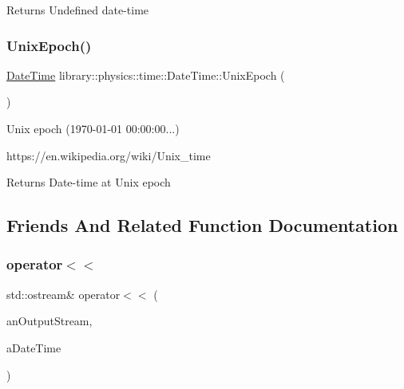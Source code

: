 \begin{DoxyReturn}{Returns}
Undefined date-\/time 
\end{DoxyReturn}
\mbox{\label{classlibrary_1_1physics_1_1time_1_1_date_time_afc52d4f5c9c6e6e13e4c16e0f15018f6}} 
\subsubsection{\texorpdfstring{Unix\+Epoch()}{UnixEpoch()}}
{\footnotesize\ttfamily \hyperlink{classlibrary_1_1physics_1_1time_1_1_date_time}{Date\+Time} library\+::physics\+::time\+::\+Date\+Time\+::\+Unix\+Epoch (\begin{DoxyParamCaption}{ }\end{DoxyParamCaption})\hspace{0.3cm}{\ttfamily [static]}}



Unix epoch (1970-\/01-\/01 00\+:00\+:00...) 

https\+://en.wikipedia.\+org/wiki/\+Unix\+\_\+time

\begin{DoxyReturn}{Returns}
Date-\/time at Unix epoch 
\end{DoxyReturn}


\subsection{Friends And Related Function Documentation}
\mbox{\label{classlibrary_1_1physics_1_1time_1_1_date_time_afd7a10118810d4133db2044ddbb7e001}} 
\subsubsection{\texorpdfstring{operator$<$$<$}{operator<<}}
{\footnotesize\ttfamily std\+::ostream\& operator$<$$<$ (\begin{DoxyParamCaption}\item[{std\+::ostream \&}]{an\+Output\+Stream,  }\item[{const \hyperlink{classlibrary_1_1physics_1_1time_1_1_date_time}{Date\+Time} \&}]{a\+Date\+Time }\end{DoxyParamCaption})\hspace{0.3cm}{\ttfamily [friend]}}



